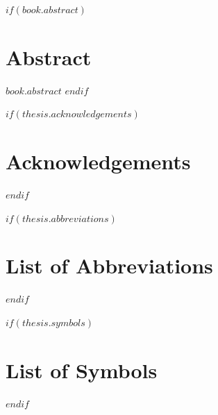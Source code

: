 $if(book.abstract)$
\chapter*{Abstract}
$book.abstract$
\clearpage
$endif$


$if(thesis.acknowledgements)$
\chapter*{Acknowledgements}

\clearpage
$endif$


\begingroup
\hypersetup{linkcolor=$if(toclinkcolor)$$toclinkcolor$$else$black$endif$}
\tableofcontents
\listoffigures
\listoftables
\endgroup
\clearpage


$if(thesis.abbreviations)$
\chapter*{List of Abbreviations}

\clearpage
$endif$


$if(thesis.symbols)$
\chapter*{List of Symbols}

\clearpage
$endif$


\clearpage
{}
\setcounter{page}{1}
\pagestyle{plain}
